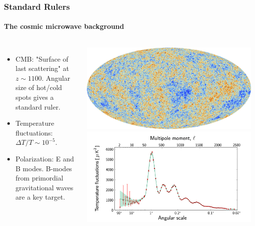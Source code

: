 \documentclass[aspectratio=169]{beamer}
\begin{document}
\begin{frame}
    \frametitle{Standard Rulers}
    \framesubtitle{The cosmic microwave background}
    \begin{columns}
        \begin{itemize}
            \item CMB:  "Surface of last scattering" at $z\sim1100$.  Angular size of hot/cold spots gives a standard ruler. \hfill {}
            \item Temperature fluctuations: $\Delta T/T \sim 10^{-5}$.  \hfill {} 
            \item  Polarization: E and B modes.  B-modes from primordial gravitational waves are a key target.
        \end{itemize}
        \includegraphics[width=\textwidth]{figures/cmb.png}
        \includegraphics[width=\textwidth]{figures/cmb_power_spectrum.jpg}%
    \end{columns}
\end{frame}
\end{document}
